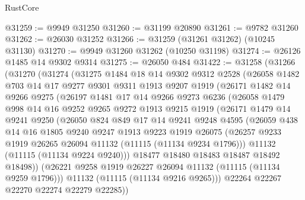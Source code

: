 \begin{lexlean}{RustCore}
\begin{coremodule}
@31259 := @9949 @31250
@31260 := @31199 @20890
@31261 := @9782 @31260
@31262 := @26030 @31252
@31266 := @31259 (@31261 @31262) (@10245 @31130)
@31270 := @9949 @31260 @31262 (@10250 @31198)
@31274 := @26126 @1485 @14 @9302 @9314
@31275 := @26050 @484
@31422 := @31258
    (@31266
      (@31270
        (@31274
          (@31275
            @1484
            @18
            @14
            @9302
            @9312
            @2528
            (@26058
              @1482
              @703
              @14
              @17
              @9277
              @9301
              @9311
              @1913
              @9207
              @1919
              (@26171
                @1482
                @14
                @9266
                @9275
                (@26197
                  @1481
                  @17
                  @14
                  @9266
                  @9273
                  @6236
                  (@26058
                    @1479
                    @998
                    @14
                    @16
                    @9252
                    @9265
                    @9272
                    @1913
                    @9215
                    @1919
                    (@26171
                      @1479
                      @14
                      @9241
                      @9250
                      (@26050
                        @824
                        @849
                        @17
                        @14
                        @9241
                        @9248
                        @4595
                        (@26059
                          @438
                          @14
                          @16
                          @1805
                          @9240
                          @9247
                          @1913
                          @9223
                          @1919
                          @26075
                          (@26257 @9233 @1919 @26265 @26094 @11132 (@11115 (@11134 @9234 @1796)))
                          @11132
                          (@11115 (@11134 @9224 @9240)))
                        @18477
                        @18480
                        @18483
                        @18487
                        @18492
                        @18498))
                    (@26221 @9258 @1919 @26227 @26094 @11132 (@11115 (@11134 @9259 @1796)))
                    @11132
                    (@11115 (@11134 @9216 @9265)))
                  @22264
                  @22267
                  @22270
                  @22274
                  @22279
                  @22285))

\end{coremodule}
\end{lexlean}
